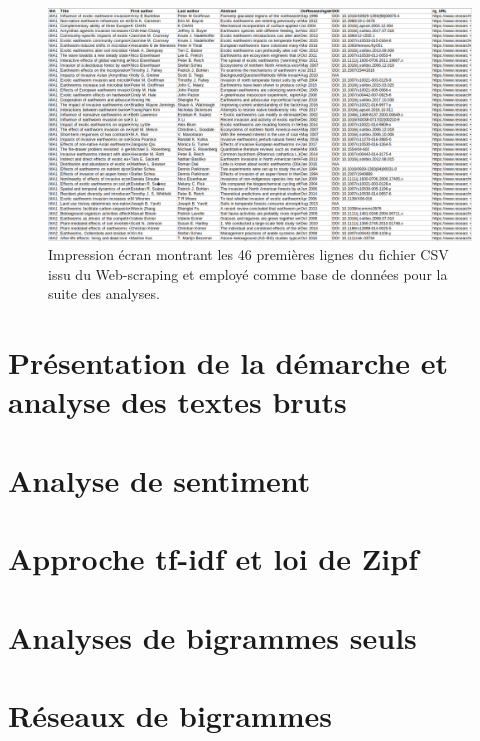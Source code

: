 \documentclass{book}
\begin{document}
\begin{figure}[H] %
    \begin{center} %
        \includegraphics[width=1.1\textwidth]{exemple_CSV_rogne2.png}
        \caption{Impression écran montrant les 46 premières lignes du fichier CSV issu du Web-scraping et employé comme base de données pour la suite des analyses.}\label{fig_CSV}
    \end{center}  
\end{figure}

\section{Présentation de la démarche et analyse des textes bruts}

\section{Analyse de sentiment}

\section{Approche tf-idf et loi de Zipf}

\section{Analyses de bigrammes seuls}

\section{Réseaux de bigrammes}

\thispagestyle{fancy}
\end{document}
